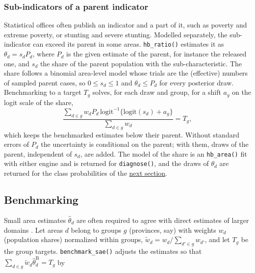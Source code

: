 \subsubsection{Sub-indicators of a parent indicator}\label{sec:methods-ratio}

Statistical offices often publish an indicator and a part of it, such as poverty and extreme poverty, or stunting and severe stunting. Modelled separately, the sub-indicator can exceed its parent in some areas. \texttt{hb\_ratio()} estimates it as \(\theta_d = s_dP_d\), where \(P_d\) is the given estimate of the parent, for instance the released one, and \(s_d\) the share of the parent population with the sub-characteristic. The share follows a binomial area-level model whose trials are the (effective) numbers of sampled parent cases, so \(0 \le s_d \le 1\) and \(\theta_d \le P_d\) for every posterior draw. Benchmarking to a target \(T_g\) solves, for each draw and group, for a shift \(a_g\) on the logit scale of the share,
\begin{equation}
\frac{\sum_{d \in g} w_d P_d\,\mathrm{logit}^{-1}\{\mathrm{logit}(s_d) + a_g\}}{\sum_{d \in g} w_d} = T_g,
\label{eq:ratio-bench}
\end{equation}
which keeps the benchmarked estimates below their parent. Without standard errors of \(P_d\) the uncertainty is conditional on the parent; with them, draws of the parent, independent of \(s_d\), are added. The model of the share is an \texttt{hb\_area()} fit with either engine and is returned for \texttt{diagnose()}, and the draws of \(\theta_d\) are returned for the class probabilities of the \hyperref[sec:methods-reliability]{next section}.

\subsection{Benchmarking}\label{sec:methods-bench}

Small area estimates \(\hat{\theta}_d\) are often required to agree with direct estimates of larger domains \citep{rao2015small, stefan2021benchmarked}. Let areas \(d\) belong to groups \(g\) (provinces, say) with weights \(w_d\) (population shares) normalized within groups, \(\tilde{w}_d = w_d / \sum_{d' \in g} w_{d'}\), and let \(T_g\) be the group targets. \texttt{benchmark\_sae()} adjusts the estimates so that \(\sum_{d \in g}\tilde{w}_d\hat{\theta}^{\mathrm{B}}_d = T_g\) by

